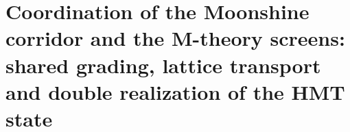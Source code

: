 





\chapter{Coordination of the Moonshine corridor and the M-theory screens: shared grading, lattice transport and double realization of the HMT state}
\label{chap:sucesor-102-25}
\label{chap:pantallas-teoria-m}


\begin{HMTScientificOwnerSubordinated}

\end{HMTScientificOwnerSubordinated}
\begingroup
\let\HMTTheoryMOriginalSection\section
\let\HMTTheoryMOriginalSubsection\subsection
\def\section[#1]#2{%
  \HMTTheoryMOriginalSection[operatorial extension of APP and spectral triad in dimension 11]{operatorial extension of APP and spectral triad of the supersymmetric interface in dimension \texorpdfstring{\(11\)}{11}}%
}
\newcount\HMTTheoryMSubsection
{}
\renewcommand{\subsection}[1]{%
  \advance\HMTTheoryMSubsection by 1
  \ifnum\HMTTheoryMSubsection=1
    \HMTTheoryMOriginalSubsection{Operatorial extension of the APP--TRIT--TPK state toward the triad \texorpdfstring{\((\mathcal H_{\mathrm{phys}},H,Q)\)}{(Hphys,H,Q)}}%
  \else
    \HMTTheoryMOriginalSubsection{#1}%
  \fi
}

\endgroup
\begin{HMTScientificOwnerSubordinated}

\end{HMTScientificOwnerSubordinated}













